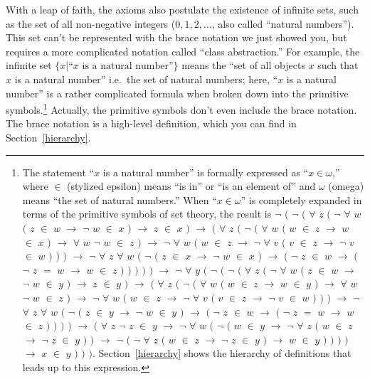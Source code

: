 With a leap of faith, the axioms also postulate the existence of infinite
sets, such as the set of all non-negative integers ($0, 1,
2,\ldots$, also called ``natural numbers'').  This set
can't be represented with the brace notation we just
showed you, but requires a more complicated notation called ``class
abstraction.''  For
example, the infinite set $\{ x |
\mbox{``$x$ is a natural number''} \} $ means the ``set of all objects $x$
such that $x$ is a natural number'' i.e.\ the set of natural numbers; here,
``$x$ is a natural number'' is a rather complicated formula when broken down
into the primitive symbols.\label{expandom}\footnote{The statement ``$x$ is a
natural number'' is formally expressed as ``$x \in \omega$,'' where $\in$
(stylized epsilon) means ``is in'' or ``is an element of'' and $\omega$
(omega) means ``the set of natural numbers.''  When ``$x\in\omega$'' is
completely expanded in terms of the primitive symbols of set theory, the
result is  $\lnot$ $($ $\lnot$ $($ $\forall$ $z$ $($ $\lnot$ $\forall$ $w$ $($
$z$ $\in$ $w$ $\rightarrow$ $\lnot$ $w$ $\in$ $x$ $)$ $\rightarrow$ $z$ $\in$
$x$ $)$ $\rightarrow$ $($ $\forall$ $z$ $($ $\lnot$ $($ $\forall$ $w$ $($ $w$
$\in$ $z$ $\rightarrow$ $w$ $\in$ $x$ $)$ $\rightarrow$ $\forall$ $w$ $\lnot$
$w$ $\in$ $z$ $)$ $\rightarrow$ $\lnot$ $\forall$ $w$ $($ $w$ $\in$ $z$
$\rightarrow$ $\lnot$ $\forall$ $v$ $($ $v$ $\in$ $z$ $\rightarrow$ $\lnot$
$v$ $\in$ $w$ $)$ $)$ $)$ $\rightarrow$ $\lnot$ $\forall$ $z$ $\forall$ $w$
$($ $\lnot$ $($ $z$ $\in$ $x$ $\rightarrow$ $\lnot$ $w$ $\in$ $x$ $)$
$\rightarrow$ $($ $\lnot$ $z$ $\in$ $w$ $\rightarrow$ $($ $\lnot$ $z$ $=$ $w$
$\rightarrow$ $w$ $\in$ $z$ $)$ $)$ $)$ $)$ $)$ $\rightarrow$ $\lnot$
$\forall$ $y$ $($ $\lnot$ $($ $\lnot$ $($ $\forall$ $z$ $($ $\lnot$ $\forall$
$w$ $($ $z$ $\in$ $w$ $\rightarrow$ $\lnot$ $w$ $\in$ $y$ $)$ $\rightarrow$
$z$ $\in$ $y$ $)$ $\rightarrow$ $($ $\forall$ $z$ $($ $\lnot$ $($ $\forall$
$w$ $($ $w$ $\in$ $z$ $\rightarrow$ $w$ $\in$ $y$ $)$ $\rightarrow$ $\forall$
$w$ $\lnot$ $w$ $\in$ $z$ $)$ $\rightarrow$ $\lnot$ $\forall$ $w$ $($ $w$
$\in$ $z$ $\rightarrow$ $\lnot$ $\forall$ $v$ $($ $v$ $\in$ $z$ $\rightarrow$
$\lnot$ $v$ $\in$ $w$ $)$ $)$ $)$ $\rightarrow$ $\lnot$ $\forall$ $z$
$\forall$ $w$ $($ $\lnot$ $($ $z$ $\in$ $y$ $\rightarrow$ $\lnot$ $w$ $\in$
$y$ $)$ $\rightarrow$ $($ $\lnot$ $z$ $\in$ $w$ $\rightarrow$ $($ $\lnot$ $z$
$=$ $w$ $\rightarrow$ $w$ $\in$ $z$ $)$ $)$ $)$ $)$ $\rightarrow$ $($
$\forall$ $z$ $\lnot$ $z$ $\in$ $y$ $\rightarrow$ $\lnot$ $\forall$ $w$ $($
$\lnot$ $($ $w$ $\in$ $y$ $\rightarrow$ $\lnot$ $\forall$ $z$ $($ $w$ $\in$
$z$ $\rightarrow$ $\lnot$ $z$ $\in$ $y$ $)$ $)$ $\rightarrow$ $\lnot$ $($
$\lnot$ $\forall$ $z$ $($ $w$ $\in$ $z$ $\rightarrow$ $\lnot$ $z$ $\in$ $y$
$)$ $\rightarrow$ $w$ $\in$ $y$ $)$ $)$ $)$ $)$ $\rightarrow$ $x$ $\in$ $y$
$)$ $)$ $)$. Section~\ref{hierarchy} shows the hierarchy of definitions that
leads up to this expression.}  Actually, the primitive symbols don't even include the brace
notation.  The brace notation is a high-level definition, which you can find in
Section~\ref{hierarchy}.

